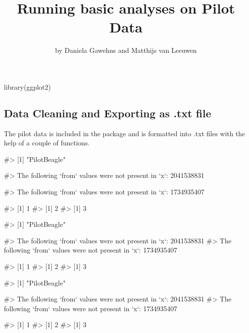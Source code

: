 \title{Running basic analyses on Pilot Data}
\author{by Daniela Gawehns and Matthijs van Leeuwen}

\maketitle


\begin{Schunk}
\begin{Sinput}
library(ggplot2)
\end{Sinput}
\end{Schunk}

\hypertarget{data-cleaning-and-exporting-as-.txt-file}{%
\subsection{Data Cleaning and Exporting as .txt
file}\label{data-cleaning-and-exporting-as-.txt-file}}

The pilot data is included in the package and is formatted into .txt
files with the help of a couple of functions.

\begin{Schunk}
\begin{Soutput}
#> [1] "PilotBeagle"
\end{Soutput}
\begin{Soutput}
#> The following `from` values were not present in `x`: 2041538831
\end{Soutput}
\begin{Soutput}
#> The following `from` values were not present in `x`: 1734935407
\end{Soutput}
\begin{Soutput}
#> [1] 1
#> [1] 2
#> [1] 3
\end{Soutput}
\begin{Soutput}
#> [1] "PilotBeagle"
\end{Soutput}
\begin{Soutput}
#> The following `from` values were not present in `x`: 2041538831
#> The following `from` values were not present in `x`: 1734935407
\end{Soutput}
\begin{Soutput}
#> [1] 1
#> [1] 2
#> [1] 3
\end{Soutput}
\begin{Soutput}
#> [1] "PilotBeagle"
\end{Soutput}
\begin{Soutput}
#> The following `from` values were not present in `x`: 2041538831
#> The following `from` values were not present in `x`: 1734935407
\end{Soutput}
\begin{Soutput}
#> [1] 1
#> [1] 2
#> [1] 3
\end{Soutput}
\end{Schunk}


